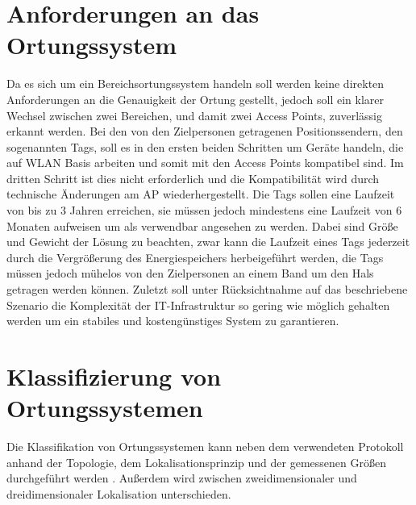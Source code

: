 \section{Anforderungen an das Ortungssystem}
\label{ch:Einleitung:sec:Anforderungen}
Da es sich um ein Bereichsortungssystem handeln soll werden keine direkten Anforderungen an die Genauigkeit der Ortung gestellt, jedoch soll ein klarer Wechsel zwischen zwei Bereichen, und damit zwei Access Points, zuverlässig erkannt werden. 
Bei den von den Zielpersonen getragenen Positionssendern, den sogenannten Tags, soll es in den ersten beiden Schritten um Geräte handeln, die auf WLAN Basis arbeiten und somit mit den Access Points kompatibel sind.
Im dritten Schritt ist dies nicht erforderlich und die Kompatibilität wird durch technische Änderungen am AP wiederhergestellt.
Die Tags sollen eine Laufzeit von bis zu 3 Jahren erreichen, sie müssen jedoch mindestens eine Laufzeit von 6 Monaten aufweisen um als verwendbar angesehen zu werden. 
Dabei sind Größe und Gewicht der Lösung zu beachten, zwar kann die Laufzeit eines Tags jederzeit durch die Vergrößerung des Energiespeichers herbeigeführt werden, die Tags müssen jedoch mühelos von den Zielpersonen an einem Band um den Hals getragen werden können.
Zuletzt soll unter Rücksichtnahme auf das beschriebene Szenario die Komplexität der IT-Infrastruktur so gering wie möglich gehalten werden um ein stabiles und kostengünstiges System zu garantieren. 

\section{Klassifizierung von Ortungssystemen}
\label{ch:Einleitung:sec:Ortungssysteme}
Die Klassifikation von Ortungssystemen kann neben dem verwendeten Protokoll anhand der Topologie, dem Lokalisationsprinzip und der gemessenen Größen durchgeführt werden \cite{liu2007survey}.
Außerdem wird zwischen zweidimensionaler und dreidimensionaler Lokalisation unterschieden.


